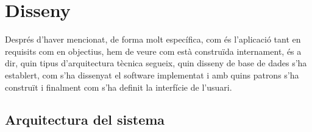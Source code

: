 
\chapter{Disseny} %

\label{Chapter6} %

Després d'haver mencionat, de forma molt específica, com és l'aplicació tant en requisits com en objectius, hem de veure com està construïda internament, és a dir, quin tipus d'arquitectura tècnica segueix, quin disseny de base de dades s'ha establert, com s'ha dissenyat el software implementat i amb quins patrons s'ha construït i finalment com s'ha definit la interfície de l'usuari.


\section{Arquitectura del sistema}

